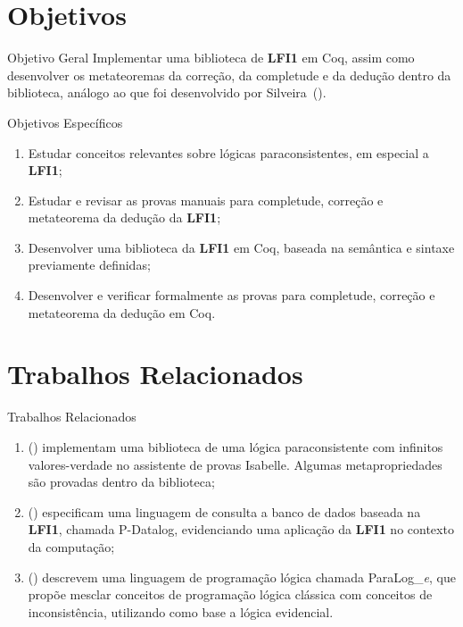 \documentclass[table]{beamer}
\newcommand{\lfium}{{\normalfont\textbf{LFI1}}}
\begin{document}
\section[]{Objetivos}
    \begin{frame}{Objetivo Geral}
        Implementar uma biblioteca de \lfium{} em Coq, assim como desenvolver os metateoremas da correção, da completude e da dedução dentro da biblioteca, análogo ao que foi desenvolvido por Silveira~(\citeyear{silveira2020implementacao}).
    \end{frame}

    \begin{frame}{Objetivos Específicos}
        \begin{enumerate}
			\item Estudar conceitos relevantes sobre lógicas paraconsistentes, em especial a \lfium{};
            \item Estudar e revisar as provas manuais para completude, correção e metateorema da dedução da \lfium{};
            \item Desenvolver uma biblioteca da \lfium{} em Coq, baseada na semântica e sintaxe previamente definidas;
            \item Desenvolver e verificar formalmente as provas para completude, correção e metateorema da dedução em Coq.
		\end{enumerate}
    \end{frame}

\section[]{Trabalhos Relacionados}
    \begin{frame}{Trabalhos Relacionados}
        \begin{enumerate}
            \item {} (\citeyear{Villadsen2017}) implementam uma biblioteca de uma lógica paraconsistente com infinitos valores-verdade no assistente de provas Isabelle. Algumas metapropriedades são provadas dentro da biblioteca;
            \item {} (\citeyear{pdatalog}) especificam uma linguagem de consulta a banco de dados baseada na \lfium{}, chamada P{-}Datalog, evidenciando uma aplicação da \lfium{} no contexto da computação;
            \item {} (\citeyear{paralog}) descrevem uma linguagem de programação lógica chamada ParaLog\_\textit{e}, que propõe mesclar conceitos de programação lógica clássica com conceitos de inconsistência, utilizando como base a lógica evidencial.
        \end{enumerate}
    \end{frame}
\end{document}
